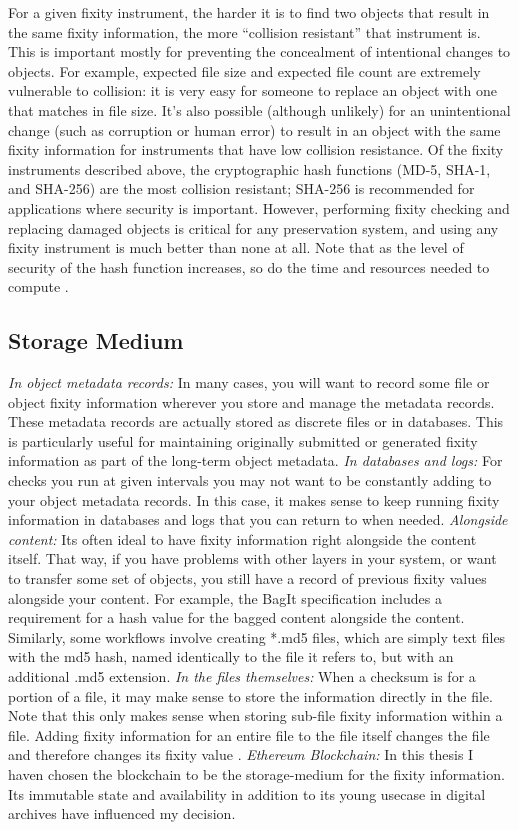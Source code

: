 For a given fixity instrument, the harder it is to find two objects that result in the same fixity information, the more “collision resistant” that instrument is. This is important mostly for preventing the concealment of intentional changes to objects. For example, expected file size and expected file count are extremely vulnerable to collision: it is very easy for someone to replace an object with one that matches in file size. It’s also possible (although unlikely) for an unintentional change (such as corruption or human error) to result in an object with the same fixity information for instruments that have low collision resistance. Of the fixity instruments described above, the cryptographic hash functions (MD-5, SHA-1, and SHA-256) are the most collision resistant; SHA-256 is recommended for applications where security is important. However, performing fixity checking and replacing damaged objects is critical for any preservation system, and using any fixity instrument is much better than none at all. Note that as the level of security of the hash function increases, so do the time and resources needed to compute \cite[7]{ndsa2014fixity}.
\subsection{Storage Medium}
\label{sec:storage-medium}
\textit{In object metadata records:} In many cases, you will want to record some file or object fixity information wherever you store and manage the metadata records. These metadata records are actually stored as discrete files or in databases. This is particularly useful for maintaining originally submitted or generated fixity information as part of the long-term object metadata. 
\textit{In databases and logs:} For checks you run at given intervals you may not want to be constantly adding to your object metadata records. In this case, it makes sense to keep running fixity information in databases and logs that you can return to when needed.
\textit{Alongside content:} Its often ideal to have fixity information right alongside the content itself. That way, if you have problems with other layers in your system, or want to transfer some set of objects, you still have a record of previous fixity values alongside your content. For example, the BagIt specification includes a requirement for a hash value for the bagged content alongside the content. Similarly, some workflows involve creating *.md5 files, which are simply text files with the md5 hash, named identically to the file it refers to, but with an additional .md5 extension.
\textit{In the files themselves:} When a checksum is for a portion of a file, it may make sense to store the information directly in the file. Note that this only makes sense when storing sub-file fixity information within a file. Adding fixity information for an entire file to the file itself changes the file and therefore changes its fixity value \cite[7]{ndsa2014fixity}.
\textit{Ethereum Blockchain:} In this thesis I haven chosen the blockchain to be the storage-medium for the fixity information. Its immutable state and availability in addition to its young usecase in digital archives have influenced my decision.